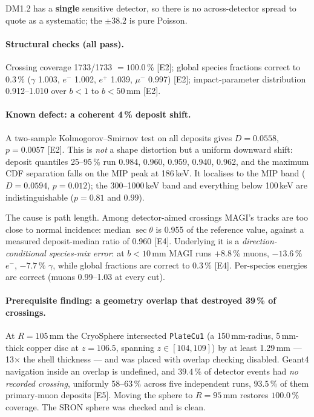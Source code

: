 \documentclass[11pt,a4paper]{article}
\newcommand{\ev}[1]{{\footnotesize\textcolor{prov}{[#1]}}}
\begin{document}
DM1.2 has a \textbf{single} sensitive detector, so there is no across-detector
spread to quote as a systematic; the $\pm38.2$ is pure Poisson.

\paragraph{Structural checks (all pass).}
Crossing coverage \num{1733}/\num{1733} $= 100.0\,\%$ \ev{E2}; global species
fractions correct to $0.3\,\%$ ($\gamma$ 1.003, $e^{-}$ 1.002, $e^{+}$ 1.039,
$\mu^{-}$ 0.997) \ev{E2}; impact-parameter distribution 0.912--1.010 over
$b<1$ to $b<50$\,mm \ev{E2}.

\paragraph{Known defect: a coherent 4\,\% deposit shift.}
A two-sample Kolmogorov--Smirnov test on all deposits gives $D = 0.0558$,
$p = 0.0057$ \ev{E2}. This is \emph{not} a shape distortion but a uniform
downward shift: deposit quantiles 25--95\,\% run 0.984, 0.960, 0.959, 0.940,
0.962, and the maximum CDF separation falls on the MIP peak at 186\,keV. It
localises to the MIP band ($D=0.0594$, $p=0.012$); the 300--1000\,keV band and
everything below 100\,keV are indistinguishable ($p = 0.81$ and $0.99$).

The cause is path length. Among detector-aimed crossings MAGI's tracks are too
close to normal incidence: median $\sec\theta$ is 0.955 of the reference value,
against a measured deposit-median ratio of 0.960 \ev{E4}. Underlying it is a
\emph{direction-conditional species-mix error}: at $b<10$\,mm MAGI runs
$+8.8\,\%$ muons, $-13.6\,\%$ $e^{-}$, $-7.7\,\%$ $\gamma$, while global
fractions are correct to $0.3\,\%$ \ev{E4}. Per-species energies are correct
(muons 0.99--1.03 at every cut).

\paragraph{Prerequisite finding: a geometry overlap that destroyed 39\,\% of crossings.}
At $R=105$\,mm the CryoSphere intersected \texttt{PlateCu1} (a 150\,mm-radius,
5\,mm-thick copper disc at $z=106.5$, spanning $z\in[104,109]$) by at least
1.29\,mm --- 13$\times$ the shell thickness --- and was placed with overlap
checking disabled. Geant4 navigation inside an overlap is undefined, and
$39.4\,\%$ of detector events had \emph{no recorded crossing}, uniformly
58--63\,\% across five independent runs, $93.5\,\%$ of them primary-muon
deposits \ev{E5}. Moving the sphere to $R=95$\,mm restores $100.0\,\%$
coverage. The SRON sphere was checked and is clean.
\end{document}
